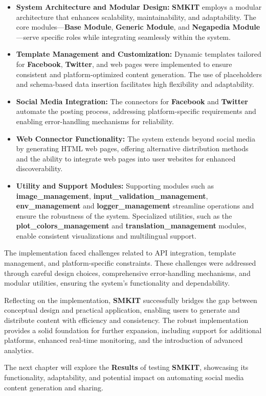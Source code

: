 \begin{itemize}
    \item \textbf{System Architecture and Modular Design:} \textbf{SMKIT} employs a modular architecture that enhances scalability, maintainability, and adaptability. The core modules—\textbf{Base Module}, \textbf{Generic Module}, and \textbf{Negapedia Module}—serve specific roles while integrating seamlessly within the system.
    \item \textbf{Template Management and Customization:} Dynamic templates tailored for \textbf{Facebook}, \textbf{Twitter}, and web pages were implemented to ensure consistent and platform-optimized content generation. The use of placeholders and schema-based data insertion facilitates high flexibility and adaptability.
    \item \textbf{Social Media Integration:} The connectors for \textbf{Facebook} and \textbf{Twitter} automate the posting process, addressing platform-specific requirements and enabling error-handling mechanisms for reliability.
    \item \textbf{Web Connector Functionality:} The system extends beyond social media by generating HTML web pages, offering alternative distribution methods and the ability to integrate web pages into user websites for enhanced discoverability.
    \item \textbf{Utility and Support Modules:} Supporting modules such as \textbf{image\_management}, \textbf{input\_validation\_management}, \textbf{env\_management} and \textbf{logger\_management} streamline operations and ensure the robustness of the system. Specialized utilities, such as the \textbf{plot\_colors\_management} and \textbf{translation\_management} modules, enable consistent visualizations and multilingual support.
\end{itemize}

The implementation faced challenges related to API integration, template management, and platform-specific constraints. These challenges were addressed through careful design choices, comprehensive error-handling mechanisms, and modular utilities, ensuring the system's functionality and dependability.

Reflecting on the implementation, \textbf{SMKIT} successfully bridges the gap between conceptual design and practical application, enabling users to generate and distribute content with efficiency and consistency. The robust implementation provides a solid foundation for further expansion, including support for additional platforms, enhanced real-time monitoring, and the introduction of advanced analytics.

The next chapter will explore the \textbf{Results} of testing \textbf{SMKIT}, showcasing its functionality, adaptability, and potential impact on automating social media content generation and sharing.
